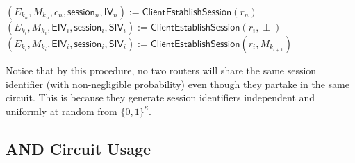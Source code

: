 \begin{algorithm*}[ht!]
\begin{algorithmic}[1]
\medskip

\State $(E_{k_n}, M_{k_n}, c_n, \mathsf{session}_n, \mathsf{IV}_n) := \mathsf{ClientEstablishSession}(r_n)$
    \State $(E_{k_i}, M_{k_i}, \mathsf{EIV}_i, \mathsf{session}_i, \mathsf{SIV}_i) := \mathsf{ClientEstablishSession}(r_i, \perp)$
  \Else
    \State $(E_{k_i}, M_{k_i}, \mathsf{EIV}_i, \mathsf{session}_i, \mathsf{SIV}_i) := \mathsf{ClientEstablishSession}(r_i, M_{k_{i+1}})$
  \EndIf
\EndFor
\EndFunction

  \end{algorithmic}
\end{algorithm*}

Notice that by this procedure, no two routers will share the same session identifier (with non-negligible probability) even though they partake in the same circuit. This is because they generate session identifiers independent and uniformly at random from $\{0,1\}^{\kappa}$. 


\subsection{AND Circuit Usage}

